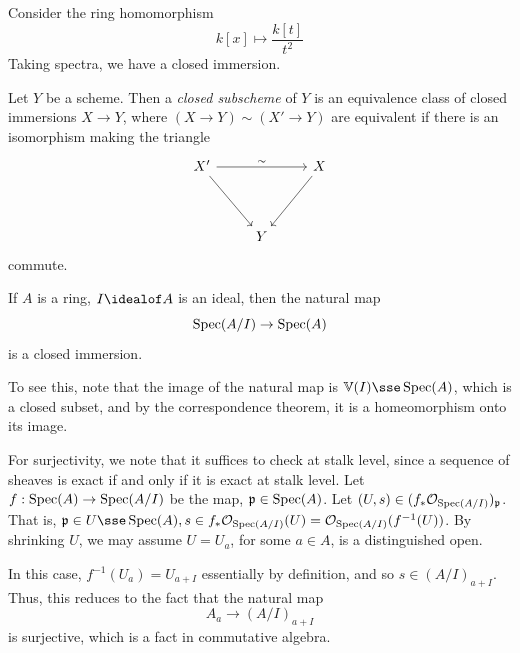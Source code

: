 \documentclass{article}
\begin{document}
\begin{example}
    Consider the ring homomorphism
    \[k[x] \mapsto \frac{k[t]}{t^2}\]
    Taking spectra, we have a closed immersion.
\end{example}

\lec

\begin{definition}
    Let \(Y\) be a scheme. Then a \emph{closed subscheme} of \(Y\) is an equivalence class of closed immersions \(X \to Y\), where \((X \to Y) \sim (X' \to Y)\) are equivalent if there is an isomorphism making the triangle
\[\begin{tikzcd}
	{X'} && X \\
	\\
	& Y
	\arrow[from=1-1, to=3-2]
	\arrow["\sim", from=1-1, to=1-3]
	\arrow[from=1-3, to=3-2]
\end{tikzcd}\]
    commute.
\end{definition}

\begin{example}
     If \(A\) is a ring, \(I \idealof A\) is an ideal, then the natural map
    \[\operatorname{Spec}(A/I) \to \operatorname{Spec}(A)\]
    is a closed immersion.
\end{example}

\begin{addendum}
    To see this, note that the image of the natural map is \(\van(I) \sse \Spec(A)\), which is a closed subset, and by the correspondence theorem, it is a homeomorphism onto its image.

    For surjectivity, we note that it suffices to check at stalk level, since a sequence of sheaves is exact if and only if it is exact at stalk level. Let \(f : \operatorname{Spec}(A) \to \operatorname{Spec}(A/I)\) be the map, \(\mathfrak{p} \in \operatorname{Spec}(A)\). Let \((U, s) \in (f_*\mathcal{O}_{\operatorname{Spec}(A/I)})_{\mathfrak{p}}\). That is, \(\mfp \in U \sse \Spec(A), s \in f_*\mcO_{\Spec(A/I)}(U) = \mcO_{\Spec(A/I)}(f^{-1}(U))\). By shrinking \(U\), we may assume \(U = U_a\), for some \(a \in A\), is a distinguished open.

    In this case, \(f^{-1}(U_a) = U_{a + I}\) essentially by definition, and so \(s \in (A/I)_{a + I}\). Thus, this reduces to the fact that the natural map
    \[A_a \to (A/I)_{a + I}\]
    is surjective, which is a fact in commutative algebra.
\end{addendum}
\end{document}
